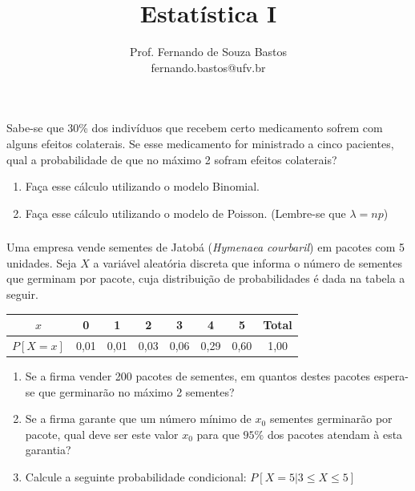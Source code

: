 \documentclass[14pt,aspectratio=1610]{beamer}
\title{Estatística I}
\author{Prof. Fernando de Souza Bastos \texorpdfstring{\\ fernando.bastos@ufv.br}{}}
\institute{Departamento de Estatística \texorpdfstring{\\ Universidade Federal de Viçosa}{}\texorpdfstring{\\ Campus UFV - Viçosa}{}}
\date{}
\begin{document}
%

\frame{\titlepage}


\begin{frame}{}
\frametitle{}
\begin{block}{}
\justifying
Sabe-se que 30\% dos indivíduos que recebem certo medicamento sofrem com alguns efeitos colaterais. Se esse medicamento for ministrado a cinco pacientes, qual a probabilidade de que no máximo 2 sofram efeitos colaterais?
\begin{enumerate}
\item Faça esse cálculo utilizando o modelo Binomial.
\item Faça esse cálculo utilizando o modelo de Poisson. (Lembre-se que $\lambda=np$)
\end{enumerate}

\end{block}
\end{frame}

\begin{frame}{}
\frametitle{}
\begin{block}{}
\justifying
Uma empresa vende sementes de Jatobá (\emph{Hymenaea courbaril}) em pacotes com 5 unidades. Seja $X$ a variável aleatória discreta que informa o número de sementes que germinam por pacote, cuja distribuição de probabilidades é dada na tabela a seguir.
\begin{table}[!htbp]
\centering
\begin{tabular}{c|cccccc|c}
$x$&0&1&2&3&4&5&Total \\ \hline
$P\left[X=x\right]$&0,01&0,01&0,03&0,06&0,29&0,60&1,00\\
\end{tabular}
\end{table}

\begin{enumerate}
\item Se a firma vender 200 pacotes de sementes, em quantos destes pacotes espera-se que germinarão no máximo 2 sementes?
\item Se a firma garante que um número mínimo de $x_0$ sementes germinarão por pacote, qual deve ser este valor $x_0$ para que $95\%$ dos pacotes atendam à esta garantia?
\item Calcule a seguinte probabilidade condicional: $P \left[X=5\left.\right|3\leq X\leq5\right]$
\end{enumerate}
\end{block}
\end{frame}
\end{document}
